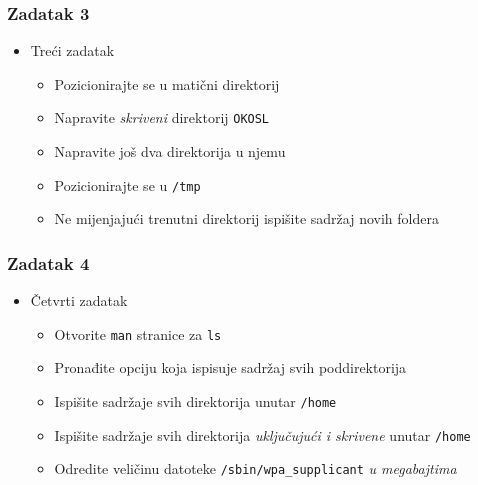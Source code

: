 \documentclass{beamer}
\newcommand{\shell}[1]{\texttt{#1}}
\begin{document}
\begin{frame}[t]
\frametitle{Zadatak 3}
\begin{itemize}
	\item Treći zadatak
	\begin{itemize}
		\item Pozicionirajte se u matični direktorij
		\item Napravite \emph{skriveni} direktorij \shell{OKOSL}
		\item Napravite još dva direktorija u njemu
		\item Pozicionirajte se u \shell{/tmp}
		\item Ne mijenjajući trenutni direktorij ispišite sadržaj novih foldera
	\end{itemize}
\end{itemize}
\end{frame}


\begin{frame}[t]
\frametitle{Zadatak 4}
\begin{itemize}
	\item Četvrti zadatak
	\begin{itemize}
		\item Otvorite \shell{man} stranice za \shell{ls}
		\item Pronađite opciju koja ispisuje sadržaj svih poddirektorija
		\item Ispišite sadržaje svih direktorija unutar \shell{/home}
		\item Ispišite sadržaje svih direktorija \emph{uključujući i skrivene} unutar \shell{/home}
		\item Odredite veličinu datoteke \shell{/sbin/wpa\_supplicant} \emph{u megabajtima}
	\end{itemize}
\end{itemize}
\end{frame}
\end{document}
